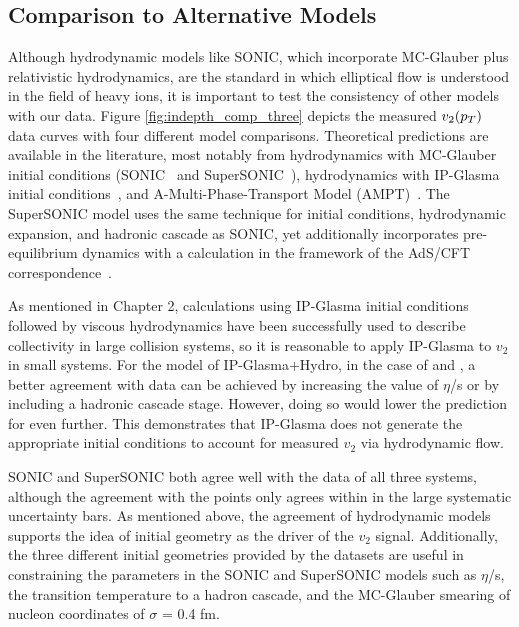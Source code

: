 \subsection{Comparison to Alternative Models}%
Although hydrodynamic models like SONIC, which incorporate MC-Glauber plus relativistic hydrodynamics, are the standard in which elliptical flow is understood in the field of heavy ions, it is important to test the consistency of other models with our data. Figure \ref{fig:indepth_comp_three} depicts the measured $v_2(\mbox{$p_T$})$ data curves with four different model comparisons. Theoretical predictions are available in the literature, most notably from hydrodynamics with MC-Glauber initial conditions (SONIC~\cite{Habich2015} and SuperSONIC~\cite{Romatschke2015}), hydrodynamics with IP-Glasma initial conditions~\cite{Schenke20141039}, and A-Multi-Phase-Transport Model (AMPT)~\cite{PhysRevC.72.064901}. The SuperSONIC model uses the same technique for initial conditions, hydrodynamic expansion, and hadronic cascade as SONIC, yet additionally incorporates pre-equilibrium dynamics with a calculation in the framework of the AdS/CFT correspondence~\cite{PhysRevLett.111.222302}.

As mentioned in Chapter 2, calculations using IP-Glasma initial conditions followed by viscous hydrodynamics have been successfully used to describe collectivity in large collision systems, so it is reasonable to apply IP-Glasma to $v_2$ in small systems. For the model of IP-Glasma+Hydro, in the case of \dau and \hau, a better agreement with data can be achieved by increasing the value of $\eta$/s or by including a hadronic cascade stage. However, doing so would lower the prediction for \pau even further. This demonstrates that IP-Glasma does not generate the appropriate initial conditions to account for measured $v_2$ via hydrodynamic flow.

SONIC and SuperSONIC both agree well with the data of all three systems, although the agreement with the \pau points only agrees within in the large systematic uncertainty bars. As mentioned above, the agreement of hydrodynamic models supports the idea of initial geometry as the driver of the $v_2$ signal. Additionally, the three different initial geometries provided by the datasets are useful in constraining the parameters in the SONIC and SuperSONIC models such as $\eta$/s, the transition temperature to a hadron cascade, and the MC-Glauber smearing of nucleon coordinates of $\sigma$ = 0.4 fm.

